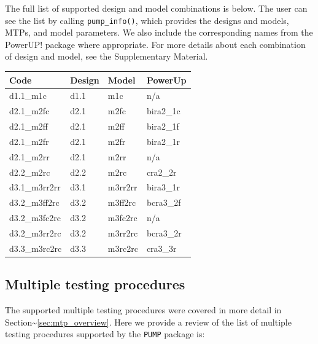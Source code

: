 \documentclass[
]{article}
\begin{document}
The full list of supported design and model combinations is below. The
user can see the list by calling \texttt{pump\_info()}, which provides
the designs and models, MTPs, and model parameters. We also include the
corresponding names from the PowerUP! package where appropriate. For
more details about each combination of design and model, see the
Supplementary Material.

\begin{tabular}{l|l|l|l}
\hline
Code & Design & Model & PowerUp\\
\hline
d1.1\_m1c & d1.1 & m1c & n/a\\
\hline
d2.1\_m2fc & d2.1 & m2fc & bira2\_1c\\
\hline
d2.1\_m2ff & d2.1 & m2ff & bira2\_1f\\
\hline
d2.1\_m2fr & d2.1 & m2fr & bira2\_1r\\
\hline
d2.1\_m2rr & d2.1 & m2rr & n/a\\
\hline
d2.2\_m2rc & d2.2 & m2rc & cra2\_2r\\
\hline
d3.1\_m3rr2rr & d3.1 & m3rr2rr & bira3\_1r\\
\hline
d3.2\_m3ff2rc & d3.2 & m3ff2rc & bcra3\_2f\\
\hline
d3.2\_m3fc2rc & d3.2 & m3fc2rc & n/a\\
\hline
d3.2\_m3rr2rc & d3.2 & m3rr2rc & bcra3\_2r\\
\hline
d3.3\_m3rc2rc & d3.3 & m3rc2rc & cra3\_3r\\
\hline
\end{tabular}

\subsection{Multiple testing procedures}

The supported multiple testing procedures were covered in more detail in
Section\textasciitilde{}\ref{sec:mtp_overview}. Here we provide a review
of the list of multiple testing procedures supported by the
\texttt{PUMP} package is:
\end{document}
